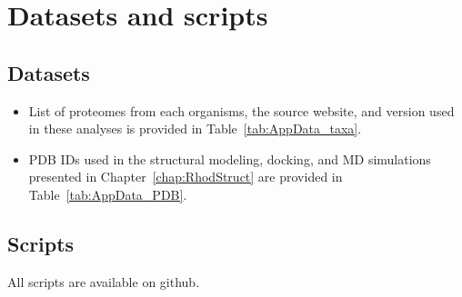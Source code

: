 \chapter{Datasets and scripts}
\label{app:Data}
\section{Datasets}
\begin{itemize}
  \item List of proteomes from each organisms, the source website, and version used in these analyses is provided in Table~\ref{tab:AppData_taxa}.\\
  \item PDB IDs used in the structural modeling, docking, and MD simulations presented in Chapter~\ref{chap:RhodStruct} are provided in Table~\ref{tab:AppData_PDB}.\\
\end{itemize}
\section{Scripts}
All scripts are available on github.
